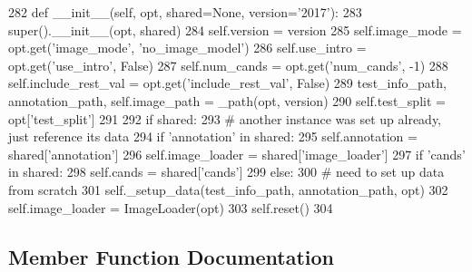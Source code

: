\begin{DoxyCode}
282     \textcolor{keyword}{def }\_\_init\_\_(self, opt, shared=None, version='2017'):
283         super().\_\_init\_\_(opt, shared)
284         self.version = version
285         self.image\_mode = opt.get(\textcolor{stringliteral}{'image\_mode'}, \textcolor{stringliteral}{'no\_image\_model'})
286         self.use\_intro = opt.get(\textcolor{stringliteral}{'use\_intro'}, \textcolor{keyword}{False})
287         self.num\_cands = opt.get(\textcolor{stringliteral}{'num\_cands'}, -1)
288         self.include\_rest\_val = opt.get(\textcolor{stringliteral}{'include\_rest\_val'}, \textcolor{keyword}{False})
289         test\_info\_path, annotation\_path, self.image\_path = \_path(opt, version)
290         self.test\_split = opt[\textcolor{stringliteral}{'test\_split'}]
291 
292         \textcolor{keywordflow}{if} shared:
293             \textcolor{comment}{# another instance was set up already, just reference its data}
294             \textcolor{keywordflow}{if} \textcolor{stringliteral}{'annotation'} \textcolor{keywordflow}{in} shared:
295                 self.annotation = shared[\textcolor{stringliteral}{'annotation'}]
296             self.image\_loader = shared[\textcolor{stringliteral}{'image\_loader'}]
297             \textcolor{keywordflow}{if} \textcolor{stringliteral}{'cands'} \textcolor{keywordflow}{in} shared:
298                 self.cands = shared[\textcolor{stringliteral}{'cands'}]
299         \textcolor{keywordflow}{else}:
300             \textcolor{comment}{# need to set up data from scratch}
301             self.\_setup\_data(test\_info\_path, annotation\_path, opt)
302             self.image\_loader = ImageLoader(opt)
303         self.reset()
304 
\end{DoxyCode}


\subsection{Member Function Documentation}
\mbox{\label{classparlai_1_1tasks_1_1coco__caption_1_1agents_1_1DefaultTeacher_a5eedc8754921674002b5e4e89899027f}} 
